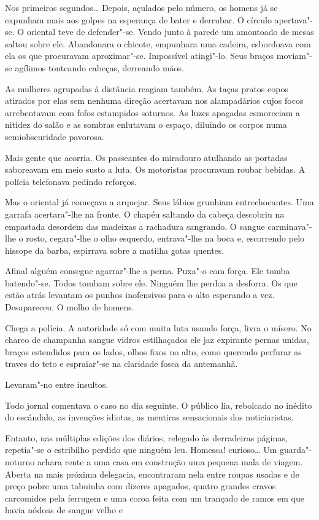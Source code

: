 \begin{linenumbers}
Nos primeiros segundos\ldots{} Depois, açulados pelo número, os homens já se
expunham mais aos golpes na esperança de bater e derrubar. O círculo
apertava"-se. O oriental teve de defender"-se. Vendo junto à parede um
amontoado de mesas saltou sobre ele. Abandonara o chicote, empunhara uma
cadeira, esbordoava com ela os que procuravam aproximar"-se. Impossível
atingi"-lo. Seus braços moviam"-se agílimos tonteando cabeças, derreando
mãos.

As mulheres agrupadas à distância reagiam também. As taças pratos copos
atirados por elas sem nenhuma direção acertavam nos alampadários cujos
focos arrebentavam com fofos estampidos soturnos. As luzes apagadas
esmoreciam a nitidez do salão e as sombras enlutavam o espaço, diluindo
os corpos numa semiobscuridade pavorosa.

Mais gente que acorria. Os passeantes do miradouro atulhando as portadas
saboreavam em meio susto a luta. Os motoristas procuravam roubar
bebidas. A polícia telefonava pedindo reforços.

Mas o oriental já começava a arquejar. Seus lábios grunhiam
entrechocantes. Uma garrafa acertara"-lhe na fronte. O chapéu saltando da
cabeça descobriu na empastada desordem das madeixas a rachadura
sangrando. O sangue carminava"-lhe o rosto, cegara"-lhe o olho esquerdo,
entrava"-lhe na boca e, escorrendo pelo hissope da barba, espirrava sobre
a matilha gotas quentes.

Afinal alguém consegue agarrar"-lhe a perna. Puxa"-o com força. Ele tomba
batendo"-se. Todos tombam sobre ele. Ninguém lhe perdoa a desforra. Os
que estão atrás levantam os punhos inofensivos para o alto esperando a
vez. Desapareceu. O molho de homens.

Chega a polícia. A autoridade só com muita luta usando força, livra o
mísero. No charco de champanha sangue vidros estilhaçados ele jaz
expirante pernas unidas, braços estendidos para os lados, olhos fixos no
alto, como querendo perfurar as traves do teto e espraiar"-se na
claridade fosca da antemanhã.

Levaram"-no entre insultos.

\asterisc

Todo jornal comentava o caso no dia seguinte. O público lia, rebolcado
no inédito do escândalo, as invenções idiotas, as mentiras sensacionais
dos noticiaristas.

Entanto, nas múltiplas edições dos diários, relegado às derradeiras
páginas, repetia"-se o estribilho perdido que ninguém leu. Homessa!
curioso\ldots{} Um guarda"-noturno achara rente a uma casa em construção uma
pequena mala de viagem. Aberta na mais próxima delegacia, encontraram
nela entre roupas usadas e de preço pobre uma tabuinha com dizeres
apagados, quatro grandes cravos carcomidos pela ferrugem e uma coroa
feita com um trançado de ramos em que havia nódoas de sangue velho e

\end{linenumbers}


